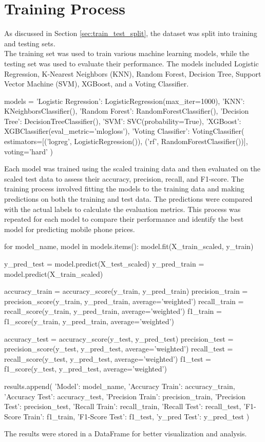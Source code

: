 \documentclass[12pt]{report}
\begin{document}
\section{Training Process}
As discussed in Section \ref{sec:train_test_split}, the dataset was split into training and testing sets. \\
The training set was used to train various machine learning models, while the testing set was used to evaluate their performance. The models included Logistic Regression, K-Nearest Neighbors (KNN), Random Forest, Decision Tree, Support Vector Machine (SVM), XGBoost, and a Voting Classifier. \\
\begin{python}
models = {
	'Logistic Regression': LogisticRegression(max_iter=1000),
	'KNN': KNeighborsClassifier(),
	'Random Forest': RandomForestClassifier(),
	'Decision Tree': DecisionTreeClassifier(),
	'SVM': SVC(probability=True),
	'XGBoost': XGBClassifier(eval_metric='mlogloss'),
	'Voting Classifier': VotingClassifier(
			estimators=[('logreg', LogisticRegression()), 
			('rf', RandomForestClassifier())], voting='hard'
	)
} 
\end{python}
Each model was trained using the scaled training data and then evaluated on the scaled test data to assess their accuracy, precision, recall, and F1-score. The training process involved fitting the models to the training data and making predictions on both the training and test data. The predictions were compared with the actual labels to calculate the evaluation metrics. This process was repeated for each model to compare their performance and identify the best model for predicting mobile phone prices. \\
\begin{python}
for model_name, model in models.items():
	model.fit(X_train_scaled, y_train)
	
	y_pred_test = model.predict(X_test_scaled)
	y_pred_train = model.predict(X_train_scaled)
	
	accuracy_train = accuracy_score(y_train, y_pred_train)
	precision_train = precision_score(y_train, y_pred_train, average='weighted')
	recall_train = recall_score(y_train, y_pred_train, average='weighted')
	f1_train = f1_score(y_train, y_pred_train, average='weighted')

	accuracy_test = accuracy_score(y_test, y_pred_test)
	precision_test = precision_score(y_test, y_pred_test, average='weighted')
	recall_test = recall_score(y_test, y_pred_test, average='weighted')
	f1_test = f1_score(y_test, y_pred_test, average='weighted')

	results.append({
			'Model': model_name,
			'Accuracy Train': accuracy_train,
			'Accuracy Test': accuracy_test,
			'Precision Train': precision_train,
			'Precision Test': precision_test,
			'Recall Train': recall_train,
			'Recall Test': recall_test,
			'F1-Score Train': f1_train,
			'F1-Score Test': f1_test,
			'y_pred Test': y_pred_test 
	})
\end{python}
The results were stored in a DataFrame for better visualization and analysis.
\end{document}
